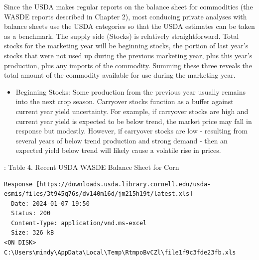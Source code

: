 \documentclass[
  letterpaper,
  DIV=11,
  numbers=noendperiod]{scrreprt}
\providecommand{\tightlist}{%
  \setlength{\itemsep}{0pt}\setlength{\parskip}{0pt}}\usepackage{longtable,booktabs,array}
\begin{document}
Since the USDA makes regular reports on the balance sheet for
commodities (the WASDE reports described in Chapter 2), most conducing
private analyses with balance sheets use the USDA categories so that the
USDA estimates can be taken as a benchmark. The supply side (Stocks) is
relatively straightforward. Total stocks for the marketing year will be
beginning stocks, the portion of last year's stocks that were not used
up during the previous marketing year, plus this year's production, plus
any imports of the commodity. Summing these three reveals the total
amount of the commodity available for use during the marketing year.

\begin{itemize}
\tightlist
\item
  Beginning Stocks: Some production from the previous year usually
  remains into the next crop season. Carryover stocks function as a
  buffer against current year yield uncertainty. For example, if
  carryover stocks are high and current year yield is expected to be
  below trend, the market price may fall in response but modestly.
  However, if carryover stocks are low - resulting from several years of
  below trend production and strong demand - then an expected yield
  below trend will likely cause a volatile rise in prices.
\end{itemize}

: Table 4. Recent USDA WASDE Balance Sheet for Corn

\begin{verbatim}
Response [https://downloads.usda.library.cornell.edu/usda-esmis/files/3t945q76s/dv140m16d/jm215h19t/latest.xls]
  Date: 2024-01-07 19:50
  Status: 200
  Content-Type: application/vnd.ms-excel
  Size: 326 kB
<ON DISK>  C:\Users\mindy\AppData\Local\Temp\RtmpoBvCZl\file1f9c3fde23fb.xls
\end{verbatim}
\end{document}
